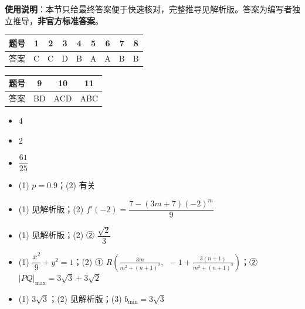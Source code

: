 
\begin{gknotice}
\textbf{使用说明}：本节只给最终答案便于快速核对，完整推导见解析版。答案为编写者独立推导，\textbf{非官方标准答案}。
\end{gknotice}

\begin{center}\begin{tabular}{ccccccccc}
\toprule
题号 & 1 & 2 & 3 & 4 & 5 & 6 & 7 & 8 \\
\midrule
答案 & C & C & D & B & A & A & B & B \\
\bottomrule
\end{tabular}\end{center}

\begin{center}\begin{tabular}{cccc}
\toprule
题号 & 9 & 10 & 11 \\
\midrule
答案 & BD & ACD & ABC \\
\bottomrule
\end{tabular}\end{center}

\begin{itemize}[leftmargin=2.6em]
  \item[\textbf{12.}] $4$
  \item[\textbf{13.}] $2$
  \item[\textbf{14.}] $\dfrac{61}{25}$
\end{itemize}

\begin{itemize}[leftmargin=2.6em]
  \item[\textbf{15.}] (1) $p=0.9$；(2) 有关
  \item[\textbf{16.}] (1) 见解析版；(2) $f'(-2)=\dfrac{7-(3m+7)(-2)^m}{9}$
  \item[\textbf{17.}] (1) 见解析版；(2) ② $\dfrac{\sqrt2}{3}$
  \item[\textbf{18.}] (1) $\dfrac{x^2}{9}+y^2=1$；(2) ① $R\left(\frac{3m}{m^2+(n+1)^2},\ \ -1+\frac{3(n+1)}{m^2+(n+1)^2}\right)$；② $|PQ|_{\max}=3\sqrt3+3\sqrt2$
  \item[\textbf{19.}] (1) $3\sqrt3$；(2) 见解析版；(3) $b_{\min}=3\sqrt3$
\end{itemize}
